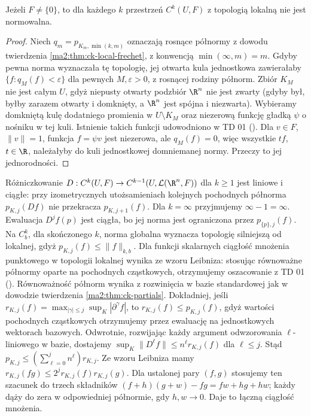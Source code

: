 \begin{stwierdzenie}
\label{ma2:prop:ck-local-nonnormable}
Jeżeli $F\ne\{0\}$, to dla każdego $k$
przestrzeń $C^k(U,F)$ z topologią lokalną
nie jest normowalna.
\end{stwierdzenie}
\begin{proof}
Niech $q_m=p_{K_m,\min(k,m)}$ oznaczają rosnące
półnormy z dowodu twierdzenia \ref{ma2:thm:ck-local-frechet},
z konwencją $\min(\infty,m)=m$.
Gdyby pewna norma wyznaczała tę topologię,
jej otwarta kula jednostkowa zawierałaby
$\{f:q_M(f)<\varepsilon\}$ dla pewnych
$M,\varepsilon>0$, z rosnącej rodziny półnorm.
Zbiór $K_M$ nie jest całym $U$, gdyż niepusty
otwarty podzbiór $\R^n$ nie jest zwarty
(gdyby był, byłby zarazem otwarty i domknięty,
a $\R^n$ jest spójna i niezwarta).
Wybieramy domkniętą kulę dodatniego promienia
w $U\setminus K_M$ oraz niezerową funkcję
gładką $\psi$ o nośniku w tej kuli.
Istnienie takich funkcji udowodniono w TD 01
().
Dla $v\in F$, $\|v\|=1$, funkcja $f=\psi v$
jest niezerowa, ale $q_M(f)=0$, więc wszystkie
$t f$, $t\in\R$, należałyby do kuli jednostkowej
domniemanej normy. Przeczy to jej jednorodności.
\end{proof}

Różniczkowanie $D:C^k(U,F)\to
C^{k-1}(U,\mathcal L(\R^n,F))$ dla $k\ge1$
jest liniowe i ciągłe: przy izometrycznych
utożsamieniach kolejnych pochodnych półnorma
$p_{K,j}(Df)$ nie przekracza $p_{K,j+1}(f)$.
Dla $k=\infty$ przyjmujemy $\infty-1=\infty$.
Ewaluacja $D^jf(p)$ jest ciągła, bo jej norma
jest ograniczona przez $p_{\{p\},j}(f)$.
Na $C_b^k$, dla skończonego $k$, norma globalna
wyznacza topologię silniejszą od lokalnej, gdyż
$p_{K,j}(f)\le\|f\|_{k,b}$.
Dla funkcji skalarnych ciągłość mnożenia
punktowego w topologii lokalnej wynika
ze wzoru Leibniza: stosując równoważne półnormy
oparte na pochodnych cząstkowych, otrzymujemy
oszacowanie z TD 01
().
Równoważność półnorm wynika z rozwinięcia
w bazie standardowej jak w dowodzie twierdzenia
\ref{ma2:thm:ck-partials}. Dokładniej, jeśli
$r_{K,j}(f)=\max_{|\gamma|\le j}\sup_K
|\partial^\gamma f|$, to
$r_{K,j}(f)\le p_{K,j}(f)$, gdyż wartości
pochodnych cząstkowych otrzymujemy przez
ewaluację na jednostkowych wektorach bazowych.
Odwrotnie, rozwijając każdy argument
odwzorowania $\ell$-liniowego w bazie,
dostajemy $\sup_K\|D^\ell f\|\le
n^\ell r_{K,j}(f)$ dla $\ell\le j$.
Stąd $p_{K,j}\le(\sum_{\ell=0}^j n^\ell)r_{K,j}$.
Ze wzoru Leibniza mamy
$r_{K,j}(fg)\le2^j r_{K,j}(f)r_{K,j}(g)$.
Dla ustalonej pary $(f,g)$ stosujemy ten
szacunek do trzech składników
$(f+h)(g+w)-fg=fw+hg+hw$;
każdy dąży do zera w odpowiedniej półnormie,
gdy $h,w\to0$. Daje to łączną ciągłość
mnożenia.

